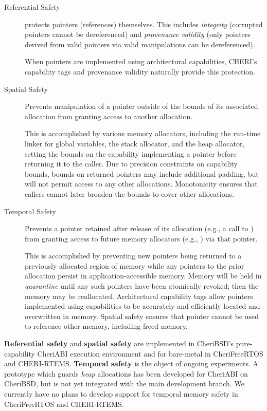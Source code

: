 \documentclass[12pt,twoside,openright,a4paper]{article}
\newcommand{\ccode}[1]{{\small\ttfamily{#1}}}
\newcommand{\cfunc}[1]{{\ccode{#1()}}}
\begin{document}
\begin{description}
\item[Referential Safety] protects pointers (references) themselves.
  This includes \textit{integrity} (corrupted pointers cannot be dereferenced)
  and \textit{provenance validity} (only pointers derived from valid pointers
  via valid manipulations can be dereferenced).

  When pointers are implemented using architectural capabilities, CHERI's
  capability tags and provenance validity naturally provide this protection.

\item[Spatial Safety] Prevents manipulation of a pointer outside of the bounds
  of its associated allocation from granting access to another allocation.

  This is accomplished by various memory allocators, including the run-time
  linker for global variables, the stack allocator, and the heap allocator,
  setting the bounds on the capability implementing a pointer before returning
  it to the caller.
  Due to precision constraints on capability bounds, bounds on returned
  pointers may include additional padding, but will not permit access to any
  other allocations.
  Monotonicity ensures that callers cannot later broaden the bounds to cover
  other allocations.

\item[Temporal Safety] Prevents a pointer retained after release of its allocation
  (e.g., a call to \cfunc{free}) from granting access to future memory allocators
  (e.g., \cfunc{malloc}) via that pointer.

  This is accomplished by preventing new pointers being returned to a
  previously allocated region of memory while any pointers to the prior
  allocation persist in application-accessible memory.
  Memory will be held in \textit{quarantine} until any such pointers have been
  atomically revoked; then the memory may be reallocated.
  Architectural capability tags allow pointers implemented using capabilities
  to be accurately and efficiently located and overwritten in memory.
  Spatial safety ensures that pointer cannot be used to reference other
  memory, including freed memory.
\end{description}

\textbf{Referential safety} and \textbf{spatial safety} are
implemented in CheriBSD's pure-capability CheriABI execution
environment and for bare-metal in CheriFreeRTOS and CHERI-RTEMS.
\textbf{Temporal safety} is the object of ongoing experiments.  A prototype which
guards \emph{heap} allocations has been developed for CheriABI on CheriBSD, but
is not yet integrated with the main development branch.
We currently have no plans to develop support for temporal memory safety in
CheriFreeRTOS and CHERI-RTEMS.
\end{document}
